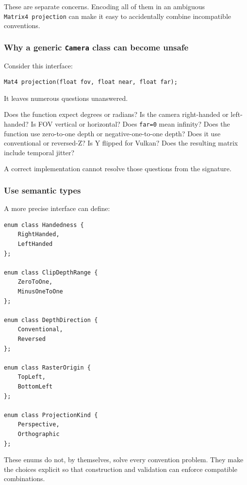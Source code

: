 These are separate concerns. Encoding all of them in an ambiguous \texttt{Matrix4\ projection} can make it easy to accidentally combine incompatible conventions.

\subsubsection{\texorpdfstring{Why a generic \texttt{Camera} class can become unsafe}{Why a generic Camera class can become unsafe}}\label{why-a-generic-camera-class-can-become-unsafe}

Consider this interface:

\begin{verbatim}
Mat4 projection(float fov, float near, float far);
\end{verbatim}

It leaves numerous questions unanswered.

Does the function expect degrees or radians? Is the camera right-handed or left-handed? Is FOV vertical or horizontal? Does \texttt{far=0} mean infinity? Does the function use zero-to-one depth or negative-one-to-one depth? Does it use conventional or reversed-Z? Is Y flipped for Vulkan? Does the resulting matrix include temporal jitter?

A correct implementation cannot resolve those questions from the signature.

\subsubsection{Use semantic types}\label{use-semantic-types}

A more precise interface can define:

\begin{verbatim}
enum class Handedness {
    RightHanded,
    LeftHanded
};

enum class ClipDepthRange {
    ZeroToOne,
    MinusOneToOne
};

enum class DepthDirection {
    Conventional,
    Reversed
};

enum class RasterOrigin {
    TopLeft,
    BottomLeft
};

enum class ProjectionKind {
    Perspective,
    Orthographic
};
\end{verbatim}

These enums do not, by themselves, solve every convention problem. They make the choices explicit so that construction and validation can enforce compatible combinations.


